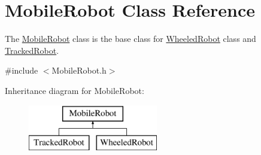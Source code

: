 \hypertarget{class_mobile_robot}{}\section{Mobile\+Robot Class Reference}
\label{class_mobile_robot}


The \mbox{\hyperlink{class_mobile_robot}{Mobile\+Robot}} class is the base class for \mbox{\hyperlink{class_wheeled_robot}{Wheeled\+Robot}} class and \mbox{\hyperlink{class_tracked_robot}{Tracked\+Robot}}.  




{\ttfamily \#include $<$Mobile\+Robot.\+h$>$}

Inheritance diagram for Mobile\+Robot\+:\begin{figure}[H]
\begin{center}
\leavevmode
\includegraphics[height=2.000000cm]{class_mobile_robot}
\end{center}
\end{figure}

